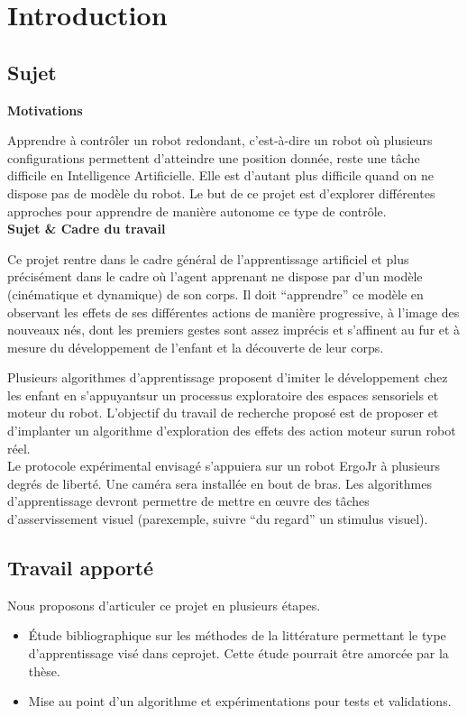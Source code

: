\documentclass[11pt,french]{report}
\begin{document}
\chapter{Introduction}
\section{Sujet}

\noindent\textbf{Motivations}

Apprendre à contrôler un robot redondant, c’est-à-dire un robot où plusieurs configurations permettent d’atteindre une position donnée, reste une tâche difficile en Intelligence Artificielle. Elle est d’autant plus difficile quand on ne dispose pas de modèle du robot. Le but de ce projet est d’explorer différentes approches pour apprendre de manière autonome ce type de contrôle.\\[10pt]
\noindent\textbf{Sujet \& Cadre du travail}

Ce projet rentre dans le cadre général de l’apprentissage artificiel et plus précisément dans le cadre où l’agent apprenant ne dispose par d’un modèle (cinématique et dynamique) de son corps. Il doit “apprendre” ce modèle en observant les effets de ses différentes actions de manière progressive, à l’image des nouveaux nés, dont les premiers gestes sont assez imprécis et s’affinent au fur et à mesure du développement de l’enfant et la découverte de leur corps.

Plusieurs algorithmes d’apprentissage proposent d’imiter le développement chez les enfant en s’appuyantsur un processus exploratoire des espaces sensoriels et moteur du robot. L’objectif du travail de recherche proposé est de proposer et d’implanter un algorithme d’exploration des effets des action moteur surun robot réel.\\[10pt]
Le protocole expérimental envisagé s’appuiera sur un robot ErgoJr à plusieurs degrés de liberté. Une caméra sera installée en bout de bras. Les algorithmes d’apprentissage devront permettre de mettre en œuvre des tâches d’asservissement visuel (parexemple, suivre “du regard” un stimulus visuel).


\section{Travail apporté}

Nous proposons d’articuler ce projet en plusieurs étapes.
\begin{itemize}
    \item Étude bibliographique sur les méthodes de la littérature permettant le type d’apprentissage visé dans ceprojet. Cette étude pourrait être amorcée par la thèse.
    \item Mise au point d’un algorithme et expérimentations pour tests et validations.
\end{itemize}
\end{document}
